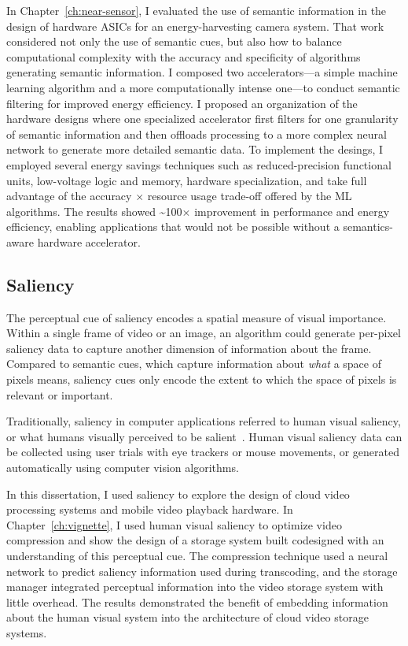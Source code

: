 In Chapter~\ref{ch:near-sensor}, I evaluated the use of semantic information in the design of hardware ASICs for an energy-harvesting camera system.
That work considered not only the use of semantic cues, but also how to balance computational complexity with the accuracy and specificity of algorithms generating semantic information.
I composed two accelerators---a simple machine learning algorithm and a more computationally intense one---to conduct semantic filtering for improved energy efficiency.
I proposed an organization of the hardware designs where one specialized accelerator first filters for one granularity of semantic information and then offloads processing to a more complex neural network to generate more detailed semantic data.
To implement the desings, I employed several energy savings techniques such as reduced-precision functional units, low-voltage logic and memory, hardware specialization, and take full advantage of the accuracy $\times$ resource usage trade-off offered by the ML algorithms.
The results showed \textasciitilde100$\times$ improvement in performance and energy efficiency, enabling applications that would not be possible without a semantics-aware hardware accelerator.

\subsection{Saliency}
The perceptual cue of saliency encodes a spatial measure of visual importance.
Within a single frame of video or an image, an algorithm could generate per-pixel saliency data to capture another dimension of information about the frame.
Compared to semantic cues, which capture information about \emph{what} a space of pixels means, saliency cues only encode the extent to which the space of pixels is relevant or important.

Traditionally, saliency in computer applications referred to human visual saliency, or what humans visually perceived to be salient~\cite{itti1998model}.
Human visual saliency data can be collected using user trials with eye trackers or mouse movements, or generated automatically using computer vision algorithms.

In this dissertation, I used saliency to explore the design of cloud video processing systems and mobile video playback hardware.
In Chapter~\ref{ch:vignette}, I used human visual saliency to optimize video compression and show the design of a storage system built codesigned with an understanding of this perceptual cue.
The compression technique used a neural network to predict saliency information used during transcoding, and the storage manager integrated perceptual information into the video storage system with little overhead.
The results demonstrated the benefit of embedding information about the human visual system into the architecture of cloud video storage systems.

